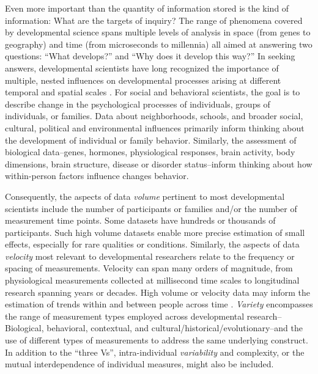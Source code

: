 \documentclass[letterpaper,man,apacite,natbib]{apa6}
\begin{document}
Even more important than the quantity of information stored is the kind of information: What are the targets of inquiry?
The range of phenomena covered by developmental science spans multiple levels of analysis in space (from genes to geography) and time (from microseconds to millennia) all aimed at answering two questions: ``What develops?'' and  ``Why does it develop this way?''
In seeking answers, developmental scientists have long recognized the importance of multiple, nested influences on developmental processes arising at different temporal and spatial scales \cite{elman_rethinking_1998,gottlieb_normally_1998,oyama_ontogeny_2000,vygotsky_mind_1980}.
For social and behavioral scientists, the goal is to describe change in the psychological processes of individuals, groups of individuals, or families.
Data about neighborhoods, schools, and broader social, cultural, political and environmental influences primarily inform thinking about the development of individual or family behavior.
Similarly, the assessment of biological data--genes, hormones, physiological responses, brain activity, body dimensions, brain structure, disease or disorder status--inform thinking about how within-person factors influence changes behavior.

Consequently, the aspects of data \emph{volume} pertinent to most developmental scientists include the number of participants or families and/or the number of measurement time points.
Some datasets have hundreds or thousands of participants.
Such high volume datasets enable more precise estimation of small effects, especially for rare qualities or conditions.
Similarly, the aspects of data \emph{velocity} most relevant to developmental researchers relate to the frequency or spacing of measurements.
Velocity can span many orders of magnitude, from physiological measurements collected at millisecond time scales to longitudinal research spanning years or decades.
High volume or velocity data may inform the estimation of trends within and between people across time \cite{rietveld_replicability_2014}.
\emph{Variety} encompasses the range of measurement types employed across developmental research--Biological, behavioral, contextual, and cultural/historical/evolutionary--and the use of different types of measurements to address the same underlying construct.
In addition to the ``three Vs'', intra-individual \emph{variability} and complexity, or the mutual interdependence of individual measures, might also be included.
\end{document}
